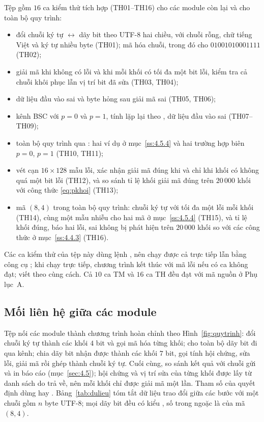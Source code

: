 Tệp  gồm $16$ ca kiểm thử tích hợp (TH01--TH16) cho các
module còn lại và cho toàn bộ quy trình:
\begin{itemize}
  \item đổi chuỗi ký tự $\leftrightarrow$ dãy bit theo UTF-8 hai chiều, với chuỗi
        rỗng, chữ tiếng Việt và ký tự nhiều byte (TH01); mã hóa chuỗi, trong đó
         cho $01001010001111$ (TH02);
  \item giải mã khi không có lỗi và khi mỗi khối có tối đa một bit lỗi, kiểm
        tra cả chuỗi khôi phục lẫn vị trí bit đã sửa (TH03, TH04);
  \item dữ liệu đầu vào sai và byte hỏng sau giải mã sai (TH05, TH06);
  \item kênh BSC với $p = 0$ và $p = 1$, tính lặp lại theo , dữ liệu
        đầu vào sai (TH07--TH09);
  \item toàn bộ quy trình qua : hai ví dụ ở mục~\ref{ss:4.5.4}
        và hai trường hợp biên $p = 0$, $p = 1$ (TH10, TH11);
  \item vét cạn $16 \times 128$ mẫu lỗi, xác nhận giải mã đúng khi và chỉ khi
        khối có không quá một bit lỗi (TH12), và so sánh tỉ lệ khối giải mã
        đúng trên $20\,000$ khối với công thức \eqref{eq:pkhoi} (TH13);
  \item mã $(8,4)$ trong toàn bộ quy trình: chuỗi ký tự với tối đa một lỗi mỗi
        khối (TH14), cùng một mẫu nhiễu cho hai mã ở mục~\ref{ss:4.5.4} (TH15),
        và tỉ lệ khối đúng, báo hai lỗi, sai không bị phát hiện trên $20\,000$
        khối so với các công thức ở mục~\ref{ss:4.4.3} (TH16).
\end{itemize}
Các ca kiểm thử của tệp này dùng lệnh , nên chạy được cả trực tiếp
lẫn bằng công cụ ; khi chạy trực tiếp, chương trình kết thúc với
mã lỗi nếu có ca không đạt;  viết theo cùng cách. Cả
$10$ ca TM và $16$ ca TH đều đạt với mã nguồn ở Phụ lục~A.

\subsection{Mối liên hệ giữa các module}
\label{ss:4.2.6}

Tệp  nối các module thành chương trình hoàn chỉnh theo
Hình~\ref{fig:quytrinh}:  đổi chuỗi ký tự thành các khối
$4$ bit và gọi  mã hóa từng khối;  cho toàn bộ
dãy bit đi qua kênh;  chia dãy bit nhận được thành các
khối $7$ bit, gọi  tính hội chứng, sửa lỗi, giải mã rồi ghép
thành chuỗi ký tự. Cuối cùng,  so sánh kết quả với chuỗi gửi và
in báo cáo (mục~\ref{sec:4.5}); hội chứng và vị trí sửa của từng khối được lấy
từ danh sách  do  trả về, nên mỗi khối chỉ được
giải mã một lần. Tham số  của  quyết định
 dùng  hay .
Bảng~\ref{tab:dulieu} tóm tắt dữ liệu trao đổi giữa các bước với một chuỗi gồm
$n$ byte UTF-8; mọi dãy bit đều có kiểu , số trong ngoặc là của
mã $(8,4)$.

